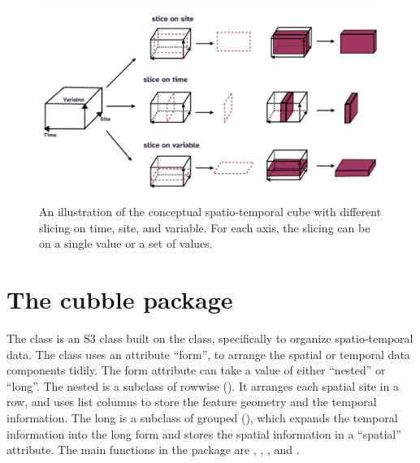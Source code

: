 \documentclass[
  shortnames]{jss}
\begin{document}
\begin{CodeChunk}
\begin{figure}

{\centering \includegraphics[width=1\linewidth]{../figures/diagram-keynotes/diagram-keynotes.001} 

}

\caption[An illustration of the conceptual spatio-temporal cube with different slicing on time, site, and variable]{An illustration of the conceptual spatio-temporal cube with different slicing on time, site, and variable. For each axis, the slicing can be on a single value or a set of values.}\label{fig:cube-def}
\end{figure}
\end{CodeChunk}

\hypertarget{cubble}{%
\section{The cubble package}\label{cubble}}

The  class is an S3 class \citep{advr} built on the  class, specifically to organize spatio-temporal data. The  class uses an attribute ``form'', to arrange the spatial or temporal data components tidily. The form attribute can take a value of either ``nested'' or ``long''. The nested  is a subclass of rowwise  (). It arranges each spatial site in a row, and uses list columns to store the feature geometry and the temporal information. The long  is a subclass of grouped  (), which expands the temporal information into the long form and stores the spatial information in a ``spatial'' attribute. The main functions in the package are , , , and .
\end{document}
